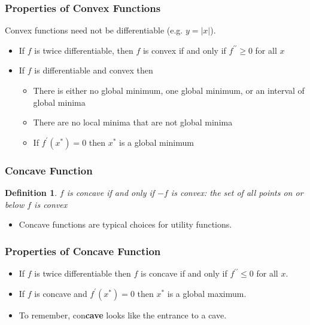 \documentclass[aspectratio=169]{beamer}
\newtheorem{defn}{Definition}
\numberwithin{equation}{section}
\begin{document}
\begin{frame}
\frametitle{Properties of Convex Functions}

Convex functions need not be differentiable (e.g. $y=|x|$). \pause

\begin{itemize}
\item If $f$ is twice differentiable, then $f$ is convex if and only if $f^{\prime\prime}\geq 0$ for all $x$ \pause

\item If $f$ is differentiable and convex then
\begin{itemize}
\item There is either no global minimum, one global minimum, or an interval of global minima \pause
\item There are no local minima that are not global minima \pause
\item If $f^\prime(x^*)=0$ then $x^*$ is a global minimum \pause
\end{itemize}
\end{itemize}

\end{frame}



\begin{frame}
\frametitle{Concave Function}

\begin{defn}
$f$ is \textit{concave} if and only if $-f$ is convex: the set of all points on or below $f$ is convex
\end{defn} \pause
\begin{itemize}
\item Concave functions are typical choices for utility functions.
\end{itemize}
\end{frame}


\begin{frame}
\frametitle{Properties of Concave Function}
\begin{itemize}
\item If $f$ is twice differentiable then $f$ is concave if and only if $f^{\prime\prime}\leq 0$ for all $x$. \pause

\item If $f$ is concave and $f^\prime(x^*)=0$ then $x^*$ is a global maximum.\pause
\item To remember, con\textbf{cave} looks like the entrance to a cave.
\end{itemize}
\end{frame}
\end{document}
